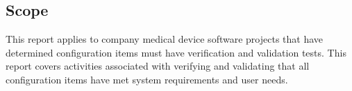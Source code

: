 \subsection{Scope}
This report applies to \Gls{company} medical device software projects that
have determined configuration items must have verification and validation tests.
This report covers activities associated with verifying and validating that all
configuration items have met system requirements and user needs.
